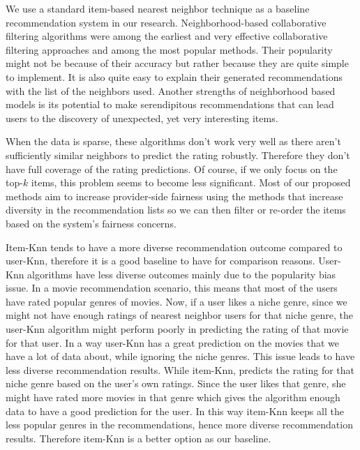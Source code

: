             We use a standard item-based nearest neighbor technique \cite{desrosiers2011comprehensive} as a baseline recommendation system in our research. Neighborhood-based collaborative filtering algorithms were among the earliest and very effective collaborative filtering approaches and among the most popular methods. Their popularity might not be because of their accuracy but rather because they are quite simple to implement. It is also quite easy to explain their generated recommendations with the list of the neighbors used. Another strengths of neighborhood based models is its potential to make serendipitous recommendations that can lead users to the discovery of unexpected, yet very interesting items.
        
            When the data is sparse, these algorithms don't work very well as there aren't sufficiently similar neighbors to predict the rating robustly. Therefore they don't have full coverage of the rating predictions. Of course, if we only focus on the top-$k$ items, this problem seems to become less significant. Most of our proposed methods aim to increase provider-side fairness using the methods that increase diversity in the recommendation lists so we can then filter or re-order the items based on the system's fairness concerns. 
        
            Item-Knn tends to have a more diverse recommendation outcome compared to user-Knn, therefore it is a good baseline to have for comparison reasons. User-Knn algorithms have less diverse outcomes mainly due to the popularity bias issue. In a movie recommendation scenario, this means that most of the users have rated popular genres of movies. Now, if a user likes a niche genre, since we might not have enough ratings of nearest neighbor users for that niche genre, the user-Knn algorithm might perform poorly in predicting the rating of that movie for that user. In a way user-Knn has a great prediction on the movies that we have a lot of data about, while ignoring the niche genres. This issue leads to have less diverse recommendation results. While item-Knn, predicts the rating for that niche genre based on the user's own ratings. Since the user likes that genre, she might have rated more movies in that genre which gives the algorithm enough data to have a good prediction for the user. In this way item-Knn keeps all the less popular genres in the recommendations, hence more diverse recommendation results. Therefore item-Knn is a better option as our baseline.
        
